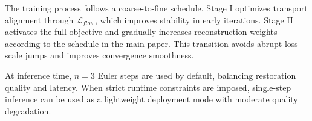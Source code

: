 The training process follows a coarse-to-fine schedule. Stage I optimizes transport alignment through $\mathcal{L}_{flow}$, which improves stability in early iterations. Stage II activates the full objective and gradually increases reconstruction weights according to the schedule in the main paper. This transition avoids abrupt loss-scale jumps and improves convergence smoothness.

At inference time, $n=3$ Euler steps are used by default, balancing restoration quality and latency. When strict runtime constraints are imposed, single-step inference can be used as a lightweight deployment mode with moderate quality degradation.
